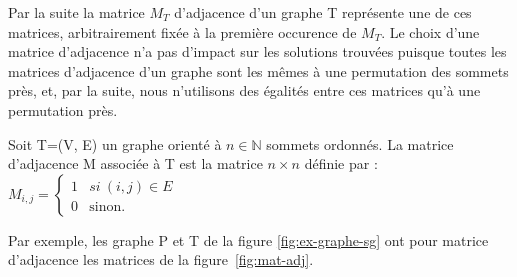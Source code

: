Par la suite la matrice $M_T$ d'adjacence d'un graphe T représente une de ces matrices, arbitrairement fixée à la première occurence de $M_T$.
Le choix d'une matrice d'adjacence n'a pas d'impact sur les solutions trouvées puisque toutes les matrices d'adjacence d'un graphe sont les mêmes à une permutation des sommets près, et, par la suite, nous n'utilisons des égalités entre ces matrices qu'à une permutation près.

\begin{defi}\label{def-adjmatrice}
Soit T=(V, E) un graphe orienté à $n \in \mathbb{N}$ sommets ordonnés. La matrice d'adjacence M associée à T est la matrice $n \times n$ définie par : 
$M_{i, j} = \left\{
  \begin{array}{ll}
	  1 & si\ (i, j) \in E
	\\0 & \mbox{sinon.}
  \end{array}
\right.
$
\end{defi}

Par exemple, les graphe P et T de la figure \ref{fig:ex-graphe-sg} ont pour matrice d'adjacence les matrices de la figure~\ref{fig:mat-adj}. 


